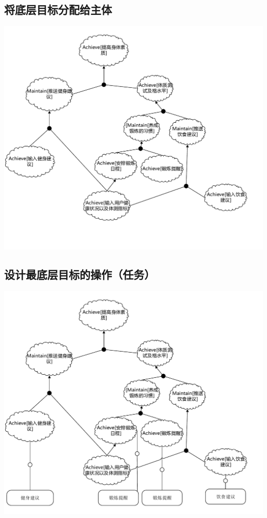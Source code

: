 \documentclass[UTF8]{ctexart}
\begin{document}
\subsection{将底层目标分配给主体}
\includegraphics[scale=0.90]{goalModel.pdf}
\subsection{设计最底层目标的操作（任务）}
\includegraphics[scale=0.90]{complete.pdf}
\end{document}
